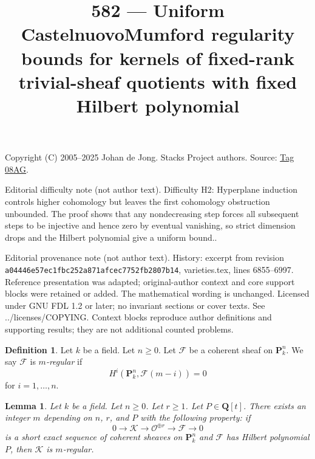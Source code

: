 \documentclass{amsart}
\theoremstyle{plain}
\newtheorem{lemma}[subsection]{Lemma}
\theoremstyle{definition}
\newtheorem{definition}[subsection]{Definition}
\theoremstyle{remark}
\numberwithin{equation}{subsection}
\begin{document}
\title[Stacks Project, Tag 08AG]{582 --- Uniform Castelnuovo\textendash{}Mumford regularity bounds for kernels of fixed-rank trivial-sheaf quotients with fixed Hilbert polynomial}
\maketitle
\noindent Copyright (C) 2005--2025 Johan de Jong. Stacks Project authors. Source: \href{https://stacks.math.columbia.edu/tag/08AG}{Tag 08AG}.

\noindent Editorial difficulty note (not author text). Difficulty H2: Hyperplane induction controls higher cohomology but leaves the first cohomology obstruction unbounded. The proof shows that any nondecreasing step forces all subsequent steps to be injective and hence zero by eventual vanishing, so strict dimension drops and the Hilbert polynomial give a uniform bound..

\noindent Editorial provenance note (not author text). History: excerpt from revision \texttt{a0444\allowbreak 6e57e\allowbreak c1fbc\allowbreak 252a8\allowbreak 71afc\allowbreak ec775\allowbreak 2fb28\allowbreak 07b14}, varieties.tex, lines 6855--6997. Reference presentation was adapted; original-author context and core support blocks were retained or added. The mathematical wording is unchanged. Licensed under GNU FDL 1.2 or later; no invariant sections or cover texts. See ../licenses/COPYING. Context blocks reproduce author definitions and supporting results; they are not additional counted problems.

\begin{definition}
\label{definition-regularity}
Let $k$ be a field. Let $n \geq 0$. Let $\mathcal{F}$ be a coherent
sheaf on $\mathbf{P}^n_k$. We say $\mathcal{F}$ is {\it $m$-regular}
if
$$
H^i(\mathbf{P}^n_k, \mathcal{F}(m - i)) = 0
$$
for $i = 1, \ldots, n$.
\end{definition}

\begin{lemma}
\label{lemma-bound-quotients-free}
Let $k$ be a field. Let $n \geq 0$. Let $r \geq 1$. Let $P \in \mathbf{Q}[t]$.
There exists an integer $m$ depending on $n$, $r$, and $P$
with the following property: if
$$
0 \to \mathcal{K} \to \mathcal{O}^{\oplus r} \to \mathcal{F} \to 0
$$
is a short exact sequence of coherent sheaves on $\mathbf{P}^n_k$
and $\mathcal{F}$ has Hilbert polynomial $P$, then
$\mathcal{K}$ is $m$-regular.
\end{lemma}
\end{document}
